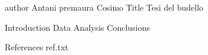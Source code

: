 author Antani premaura Cosimo
Title Tesi del budello

Introduction 
Data
Analysis
Conclusions

References
ref.txt